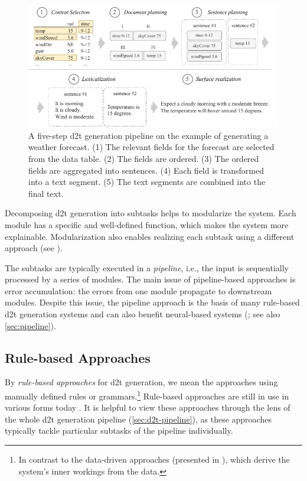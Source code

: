 {\begin{figure}[t]
    \centering
    \includegraphics[width=\textwidth]{img/pipeline.pdf}

    \caption[A data-to-text generation pipeline.]{A five-step \ac{d2t} generation pipeline on the example of generating a weather forecast. (1) The relevant fields for the forecast are selected from the data table. (2) The fields are ordered. (3) The ordered fields are aggregated into sentences. (4) Each field is transformed into a text segment. (5) The text segments are combined into the final text.}\label{fig:pipeline}

\end{figure}


Decomposing \ac{d2t} generation into subtasks helps to modularize the system. Each module has a specific and well-defined function, which makes the system more explainable. Modularization also enables realizing each subtask using a different approach (see ).

The subtasks are typically executed in a \emph{pipeline}, i.e., the input is sequentially processed by a series of modules. The main issue of pipeline-based approaches is error accumulation: the errors from one module propagate to downstream modules. Despite this issue, the pipeline approach is the basis of many rule-based \ac{d2t} generation systems \cite{milleModD2TMultilayerDataset2023} and can also benefit neural-based systems (\citealp{moryossef2019step,puduppullyDatatotextGenerationMacro2021}; see also \autoref{sec:pipeline}).


\subsection{Rule-based Approaches}
\label{sec:rule-d2t}

By \emph{rule-based approaches} for \ac{d2t} generation, we mean the approaches using manually defined rules or grammars.\footnote{In contrast to the data-driven approaches (presented in ), which derive the system's inner workings from the data.} Rule-based approaches are still in use in various forms today \cite{gattSurveyStateArt2018,daleNaturalLanguageGeneration2020,daleNavigatingTextGeneration2023}. It is helpful to view these approaches through the lens of the whole \ac{d2t} generation pipeline (\autoref{sec:d2t-pipeline}), as these approaches typically tackle particular subtasks of the pipeline individually.


}
